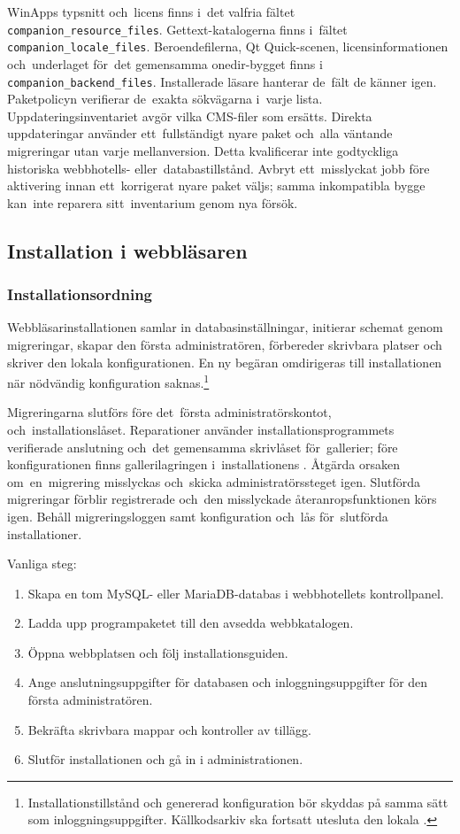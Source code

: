 \documentclass[11pt,a4paper]{article}
\newcommand{\filepath}[1]{\path{#1}}
\newcommand{\codeword}[1]{\nolinkurl{#1}}
\begin{document}
WinApps typsnitt och~licens finns i~det valfria fältet
\codeword{companion_resource_files}. Gettext-katalogerna finns i~fältet
\codeword{companion_locale_files}. Beroendefilerna, Qt Quick-scenen,
licensinformationen och~underlaget för~det gemensamma onedir-bygget finns i
\codeword{companion_backend_files}. Installerade läsare hanterar de~fält de
känner igen. Paketpolicyn verifierar de~exakta sökvägarna i~varje lista.
Uppdateringsinventariet avgör vilka CMS-filer som ersätts. Direkta
uppdateringar använder ett~fullständigt nyare paket och~alla
väntande migreringar utan varje mellanversion. Detta kvalificerar inte
godtyckliga
historiska webbhotells- eller~databastillstånd. Avbryt ett~misslyckat jobb före
aktivering innan ett~korrigerat nyare paket väljs; samma inkompatibla bygge
kan~inte reparera sitt~inventarium genom nya försök.

\subsection{Installation i webbläsaren}

\subsubsection{Installationsordning}

Webbläsarinstallationen samlar in databasinställningar, initierar schemat genom
migreringar, skapar den första administratören, förbereder skrivbara platser och
skriver den lokala konfigurationen. En ny begäran omdirigeras till
installationen när nödvändig konfiguration
saknas.\footnote{Installationstillstånd och genererad konfiguration bör skyddas
på samma sätt som inloggningsuppgifter. Källkodsarkiv ska fortsatt utesluta den
lokala \filepath{config.php}.}

Migreringarna slutförs före det~första administratörskontot,
\filepath{config.php} och~installationslåset. Reparationer använder
installationsprogrammets verifierade anslutning och~det gemensamma skrivlåset
för~gallerier; före konfigurationen finns gallerilagringen i~installationens
\filepath{galleries/}. Åtgärda orsaken om~en~migrering misslyckas och~skicka
administratörssteget igen. Slutförda migreringar förblir registrerade och~den
misslyckade återanropsfunktionen körs igen. Behåll migreringsloggen samt
konfiguration och~lås för~slutförda installationer.

Vanliga steg:

\begin{enumerate}
  \item Skapa en tom MySQL- eller MariaDB-databas i webbhotellets kontrollpanel.
  \item Ladda upp programpaketet till den avsedda webbkatalogen.
  \item Öppna webbplatsen och följ installationsguiden.
  \item Ange anslutningsuppgifter för databasen och inloggningsuppgifter för den
  första administratören.
  \item Bekräfta skrivbara mappar och kontroller av tillägg.
  \item Slutför installationen och gå in i administrationen.
\end{enumerate}
\end{document}
